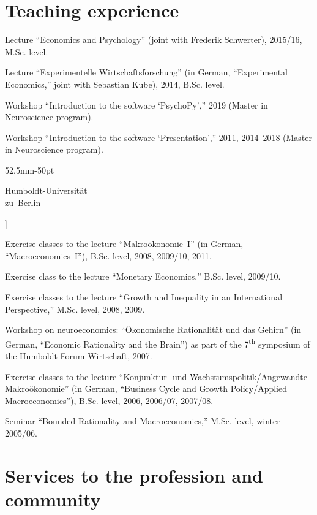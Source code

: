 \documentclass[11pt, a4paper, titleabove]{simplecv}
\renewcommand{\topicmargin}{52.5mm}
\newcommand{\multiline}[1]{%
	\parbox[t][10pt][t]{\topicmargin-50pt}{\RaggedLeft%
		#1%
		\normalsize\par%
	}%
}
\begin{document}
\section{Teaching experience}

\begin{topic}

	\item[University of Bonn]
	Lecture ``Economics and Psychology'' (joint with Frederik Schwer\-ter), 2015/16, M.Sc. level.
	
	Lecture {``Experimentelle Wirtschaftsforschung''} (in German, ``Ex\-peri\-mental Economics,'' joint with Sebastian Kube), 2014, B.Sc. level.
	
	Workshop ``Introduction to the software `PsychoPy','' 2019 (Master in Neuroscience program).

	Workshop ``Introduction to the software `Presentation','' 2011, 2014--2018 (Master in Neuroscience program).

	\item[\multiline{Humboldt-Universität \\ zu~Berlin}]

	Exercise classes to the lecture {``Makroökonomie~I''} (in German, ``Macro\-economics~I''), B.Sc. level, 2008, 2009/10, 2011.
	
	Exercise class to the lecture ``Monetary Economics,'' B.Sc. level, 2009/10.
	
	Exercise classes to the lecture ``Growth and Inequality in an Inter\-national Perspective,'' M.Sc. level, 2008, 2009.
	
	Workshop on neuroeconomics: {``Ökonomische Rationalität und das Gehirn''} (in German, ``Economic Rationality and the Brain'') as part of the 7\textsuperscript{th} symposium of the {Humboldt-Forum Wirtschaft,} 2007.
	
	Exercise classes to the lecture {``Konjunktur- und Wachs\-tums\-politik/\hspace{0pt}Angewandte Makroökonomie''} (in German, ``Business Cycle and Growth Policy/\hspace{0pt}Applied Macroeconomics''), B.Sc. level, 2006, 2006/07, 2007/08.
	
	Seminar ``Bounded Rationality and Macroeconomics,'' M.Sc. level, winter 2005/06.

\end{topic}
	
	
\section{Services to the profession and community}
\end{document}
